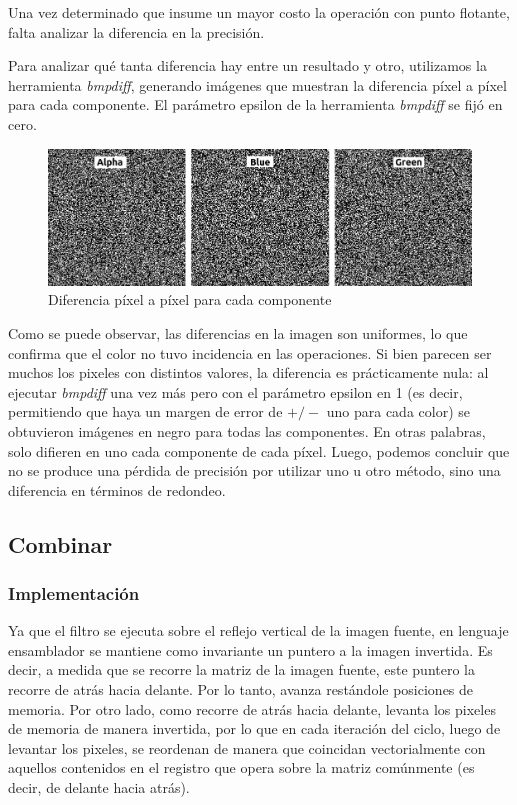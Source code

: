 \documentclass[a4paper]{article}
\begin{document}
Una vez determinado que insume un mayor costo la operación con punto flotante, falta analizar la diferencia en la precisión.

Para analizar qué tanta diferencia hay entre un resultado y otro, utilizamos la herramienta \textit{bmpdiff}, generando imágenes que muestran la diferencia píxel a píxel para cada componente. El parámetro epsilon de la herramienta \textit{bmpdiff} se fijó en cero.
\\
\begin{figure}[H]
  \begin{center}
	\includegraphics[scale=0.40]{imagenes/pixelardiffExp.jpeg}
	\caption{Diferencia píxel a píxel para cada componente}
	\label{pixelar_diff}
  \end{center}
\end{figure}

Como se puede observar, las diferencias en la imagen son uniformes, lo que confirma que el color no tuvo incidencia en las operaciones. Si bien parecen ser muchos los pixeles con distintos valores, la diferencia es prácticamente nula: al ejecutar \textit{bmpdiff} una vez más pero con el parámetro epsilon en 1 (es decir, permitiendo que haya un margen de error de $+/-$ uno para cada color) se obtuvieron imágenes en negro para todas las componentes. En otras palabras, solo difieren en uno cada componente de cada píxel. Luego, podemos concluir que no se produce una pérdida de precisión por utilizar uno u otro método, sino una diferencia en términos de redondeo.

\newpage
\subsection{Combinar}
\subsubsection{Implementación}
Ya que el filtro se ejecuta sobre el reflejo vertical de la imagen fuente, en lenguaje ensamblador se mantiene como invariante un puntero a la imagen invertida. Es decir, a medida que se recorre la matriz de la imagen fuente, este puntero la recorre de atrás hacia delante. Por lo tanto, avanza restándole posiciones de memoria. Por otro lado, como recorre de atrás hacia delante, levanta los pixeles de memoria de manera invertida, por lo que en cada iteración del ciclo, luego de levantar los pixeles, se reordenan de manera que coincidan vectorialmente con aquellos contenidos en el registro que opera sobre la matriz comúnmente (es decir, de delante hacia atrás).
\\
\end{document}
